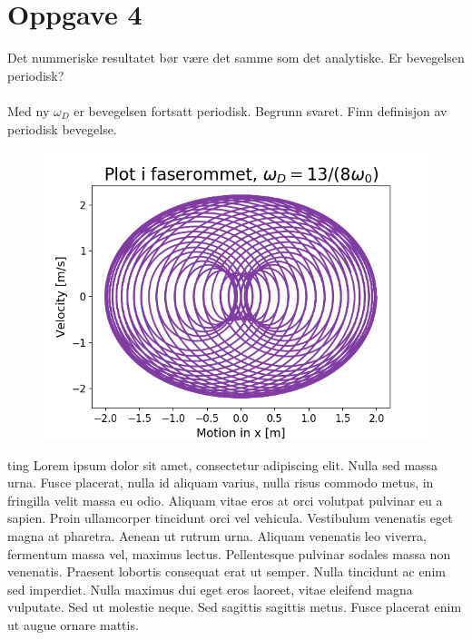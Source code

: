 \documentclass[norsk,a4paper,12pt]{article}
\begin{document}
\section*{Oppgave 4}

Det nummeriske resultatet bør være det samme som det analytiske. Er bevegelsen periodisk?
\\
\\
Med ny $\omega_D$ er bevegelsen fortsatt periodisk. Begrunn svaret. Finn definisjon av periodisk bevegelse.

\begin{figure}[H]
\includegraphics[scale=0.8]{Oppgave4del1.png}
\end{figure}

ting
Lorem ipsum dolor sit amet, consectetur adipiscing elit. Nulla sed massa urna. Fusce placerat, nulla id aliquam varius, nulla risus commodo metus, in fringilla velit massa eu odio. Aliquam vitae eros at orci volutpat pulvinar eu a sapien. Proin ullamcorper tincidunt orci vel vehicula. Vestibulum venenatis eget magna at pharetra. Aenean ut rutrum urna. Aliquam venenatis leo viverra, fermentum massa vel, maximus lectus. Pellentesque pulvinar sodales massa non venenatis. Praesent lobortis consequat erat ut semper. Nulla tincidunt ac enim sed imperdiet. Nulla maximus dui eget eros laoreet, vitae eleifend magna vulputate. Sed ut molestie neque. Sed sagittis sagittis metus. Fusce placerat enim ut augue ornare mattis.
\\
\end{document}
